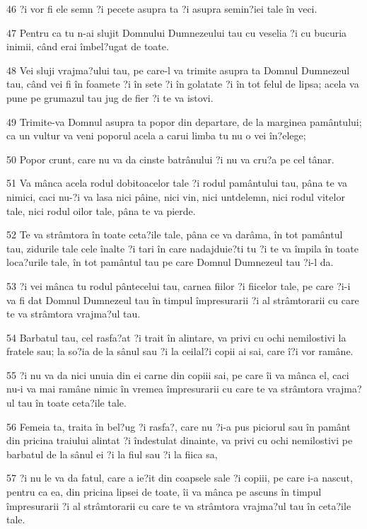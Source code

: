 \par 46 ?i vor fi ele semn ?i pecete asupra ta ?i asupra semin?iei tale în veci.
\par 47 Pentru ca tu n-ai slujit Domnului Dumnezeului tau cu veselia ?i cu bucuria inimii, când erai îmbel?ugat de toate.
\par 48 Vei sluji vrajma?ului tau, pe care-l va trimite asupra ta Domnul Dumnezeul tau, când vei fi în foamete ?i în sete ?i în golatate ?i în tot felul de lipsa; acela va pune pe grumazul tau jug de fier ?i te va istovi.
\par 49 Trimite-va Domnul asupra ta popor din departare, de la marginea pamântului; ca un vultur va veni poporul acela a carui limba tu nu o vei în?elege;
\par 50 Popor crunt, care nu va da cinste batrânului ?i nu va cru?a pe cel tânar.
\par 51 Va mânca acela rodul dobitoacelor tale ?i rodul pamântului tau, pâna te va nimici, caci nu-?i va lasa nici pâine, nici vin, nici untdelemn, nici rodul vitelor tale, nici rodul oilor tale, pâna te va pierde.
\par 52 Te va strâmtora în toate ceta?ile tale, pâna ce va darâma, în tot pamântul tau, zidurile tale cele înalte ?i tari în care nadajduie?ti tu ?i te va împila în toate loca?urile tale, în tot pamântul tau pe care Domnul Dumnezeul tau ?i-l da.
\par 53 ?i vei mânca tu rodul pântecelui tau, carnea fiilor ?i fiicelor tale, pe care ?i-i va fi dat Domnul Dumnezeul tau în timpul împresurarii ?i al strâmtorarii cu care te va strâmtora vrajma?ul tau.
\par 54 Barbatul tau, cel rasfa?at ?i trait în alintare, va privi cu ochi nemilostivi la fratele sau; la so?ia de la sânul sau ?i la ceilal?i copii ai sai, care î?i vor ramâne.
\par 55 ?i nu va da nici unuia din ei carne din copiii sai, pe care îi va mânca el, caci nu-i va mai ramâne nimic în vremea împresurarii cu care te va strâmtora vrajma?ul tau în toate ceta?ile tale.
\par 56 Femeia ta, traita în bel?ug ?i rasfa?, care nu ?i-a pus piciorul sau în pamânt din pricina traiului alintat ?i îndestulat dinainte, va privi cu ochi nemilostivi pe barbatul de la sânul ei ?i la fiul sau ?i la fiica sa,
\par 57 ?i nu le va da fatul, care a ie?it din coapsele sale ?i copiii, pe care i-a nascut, pentru ca ea, din pricina lipsei de toate, îi va mânca pe ascuns în timpul împresurarii ?i al strâmtorarii cu care te va strâmtora vrajma?ul tau în ceta?ile tale.
